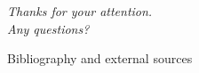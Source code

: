 \begin{frame}
  \centering \Huge \emph{Thanks for your attention.\\Any questions?}
\end{frame}

\nocite{*}

\begin{frame}[allowframebreaks]{Bibliography and external sources}
  \printbibliography
\end{frame}


